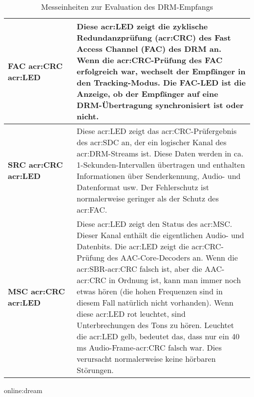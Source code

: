 \begin{table}[h]
\begin{center}
\begin{tabular}{|p{0.28\linewidth} | p{0.72\linewidth}|}
			\midrule
			\textbf{FAC \gls{acr:CRC} \gls{acr:LED}} & Diese \gls{acr:LED} zeigt die zyklische Redundanzprüfung (\gls{acr:CRC}) des Fast Access Channel (FAC) des DRM an. Wenn die \gls{acr:CRC}-Prüfung des FAC erfolgreich war, wechselt der Empfänger in den Tracking-Modus. Die FAC-LED ist die Anzeige, ob der Empfänger auf eine DRM-Übertragung synchronisiert ist oder nicht. \\
			\midrule
			\textbf{SRC \gls{acr:CRC} \gls{acr:LED}} & 	Diese \gls{acr:LED} zeigt das \gls{acr:CRC}-Prüfergebnis des \gls{acr:SDC} an, der ein logischer Kanal des \gls{acr:DRM}-Streams ist. Diese Daten werden in ca. 1-Sekunden-Intervallen übertragen und enthalten Informationen über Senderkennung, Audio- und Datenformat usw. Der Fehlerschutz ist normalerweise geringer als der Schutz des \gls{acr:FAC}. \\
			\midrule
			\textbf{MSC \gls{acr:CRC} \gls{acr:LED}} & Diese \gls{acr:LED} zeigt den Status des \gls{acr:MSC}. Dieser Kanal enthält die eigentlichen Audio- und Datenbits. Die \gls{acr:LED} zeigt die \gls{acr:CRC}-Prüfung des AAC-Core-Decoders an.  Wenn die \gls{acr:SBR}-\gls{acr:CRC} falsch ist, aber die AAC-\gls{acr:CRC} in Ordnung ist, kann man immer noch etwas hören (die hohen Frequenzen sind in diesem Fall natürlich nicht vorhanden). Wenn diese \gls{acr:LED} rot leuchtet, sind Unterbrechungen des Tons zu hören. Leuchtet die \gls{acr:LED} gelb, bedeutet das, dass nur ein 40 ms Audio-Frame-\gls{acr:CRC} falsch war. Dies verursacht normalerweise keine hörbaren Störungen.\\
			\bottomrule
		\end{tabular}
		\caption{Messeinheiten zur Evaluation des DRM-Empfangs}
		\gls{online:dream}
		\label{tab:drmmess}
	\end{center}
\end{table}


